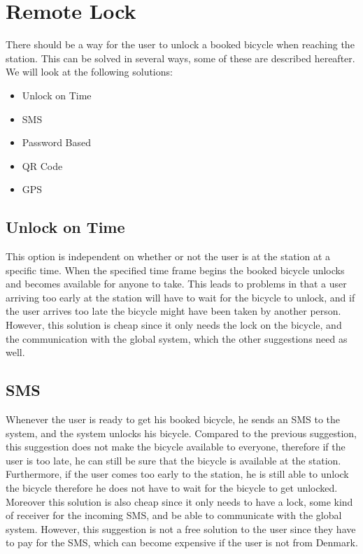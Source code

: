 \section{Remote Lock}\label{sec:remoteLock}
There should be a way for the user to unlock a booked bicycle when reaching the station.
This can be solved in several ways, some of these are described hereafter.
We will look at the following solutions:

\begin{itemize}
	\item Unlock on Time
	\item SMS
	\item Password Based
	\item QR Code
	\item GPS
\end{itemize}

\subsection{Unlock on Time}
This option is independent on whether or not the user is at the station at a specific time.
When the specified time frame begins the booked bicycle unlocks and becomes available for anyone to take.
This leads to problems in that a user arriving too early at the station will have to wait for the bicycle to unlock, and if the user arrives too late the bicycle might have been taken by another person.
However, this solution is cheap since it only needs the lock on the bicycle, and the communication with the global system, which the other suggestions need as well.

\subsection{SMS}
Whenever the user is ready to get his booked bicycle, he sends an SMS to the system, and the system unlocks his bicycle.
Compared to the previous suggestion, this suggestion does not make the bicycle available to everyone, therefore if the user is too late, he can still be sure that the bicycle is available at the station.
Furthermore, if the user comes too early to the station, he is still able to unlock the bicycle therefore he does not have to wait for the bicycle to get unlocked.
Moreover this solution is also cheap since it only needs to have a lock, some kind of receiver for the incoming SMS, and be able to communicate with the global system.
However, this suggestion is not a free solution to the user since they have to pay for the SMS, which can become expensive if the user is not from Denmark.

